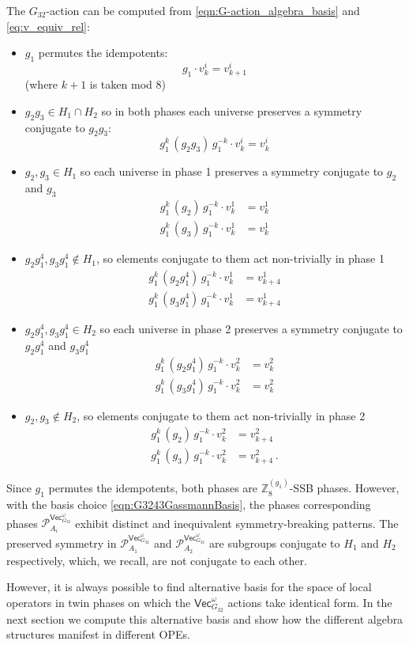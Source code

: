 \documentclass[aps,twocolumn,prx,floatfix,preprintnumbers, nofootinbib,10pt]{revtex4-2}
\numberwithin{equation}{section}
\theoremstyle{definition}
\newcommand{\be}{\begin{equation}}
\newcommand{\ee}{\end{equation}}
\newcommand{\ba}{\begin{aligned}}
\newcommand{\ea}{\end{aligned}}
\newcommand{\Z}{{\mathbb Z}}
\newcommand{\cP}{\mathcal{P}}
\renewcommand{\Vec}{\mathsf{Vec}}
\begin{document}
The $G_{32}$-action can be computed from \eqref{eqn:G-action_algebra_basis} and \eqref{eq:v_equiv_rel}: 
\begin{itemize}
    \item $g_1$ permutes the idempotents:
    \be \label{eq:g1_act_H1H2}
    g_1\cdot v^i_{k} = v^i_{k+1}
    \ee
    (where $k+1$ is taken mod 8)
    \item $g_2g_3 \in H_1\cap H_2$ so in both phases each universe preserves a symmetry conjugate to $g_2g_3$:
    \be
     g_1^k\,(g_2g_3)\,g_1^{-k}\cdot v^i_{k} = v^i_{k}
    \ee
    \item $g_2,g_3\in H_1$ so each universe in phase 1 preserves a symmetry conjugate to $g_2$ and $g_3$
    \be\ba
    g_1^k\,(g_2)\,g_1^{-k}\cdot v^1_{k} &= v^1_{k} \\
    g_1^k\,(g_3)\,g_1^{-k}\cdot v^1_{k} &= v^1_{k}
    \ea\ee
     \item $g_2g_1^4,g_3g_1^4\notin H_1$, so elements conjugate to them act non-trivially in phase 1
         \be\ba
     g_1^k\,(g_2g_1^4)\,g_1^{-k}\cdot v^1_{k} &= v^1_{k+4}\\
     g_1^k\,(g_3g_1^4)\,g_1^{-k}\cdot v^1_{k} &= v^1_{k+4}
     \ea\ee
    \item $g_2g_1^4,g_3g_1^4\in H_2$ so each universe in phase 2 preserves a symmetry conjugate to $g_2g_1^4$ and $g_3g_1^4$
    \be\ba
    g_1^k\,(g_2g_1^4)\,g_1^{-k}\cdot v^2_{k} &= v^2_{k} \\
    g_1^k\,(g_3g_1^4)\,g_1^{-k}\cdot v^2_{k} &= v^2_{k}
    \ea\ee
    \item $g_2,g_3\notin H_2$, so elements conjugate to them act non-trivially in phase 2
        \be\ba
    g_1^k\,(g_2)\,g_1^{-k}\cdot v^2_{k} &= v^2_{k+4} \\
    g_1^k\,(g_3)\,g_1^{-k}\cdot v^2_{k} &= v^2_{k+4}\,.
    \ea\ee
\end{itemize}
Since $g_1$ permutes the idempotents, both phases are $\Z_8^{(g_1)}$-SSB phases. However, with the basis choice \eqref{eqn:G3243GassmannBasis}, the phases corresponding phases $\cP^{\Vec_{G_{32}}^\omega}_{A_i}$ exhibit distinct and inequivalent symmetry-breaking patterns. The preserved symmetry in $\cP^{\Vec_{G_{32}}^\omega}_{A_1}$ and $\cP^{\Vec_{G_{32}}^\omega}_{A_2}$ are subgroups conjugate to $H_1$ and $H_2$ respectively, which, we recall, are not conjugate to each other.

However, it is always possible to find alternative basis for the space of local operators in twin phases on which the $\Vec_{G_{32}}^\omega$ actions take identical form. In the 
next section we compute this alternative basis and show how the different algebra structures manifest in different OPEs.
\end{document}
